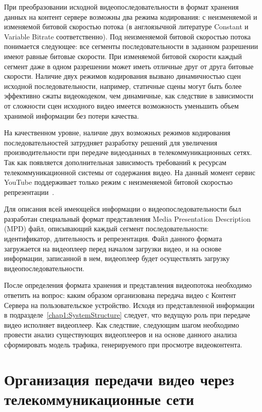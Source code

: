 При преобразовании исходной видеопоследовательности в формат хранения данных на контент сервере возможны два режима кодирования: с неизменяемой и изменяемой битовой скоростью потока (в англоязычной литературе Constant и Variable Bitrate соответственно). Под неизменяемой битовой скоростью потока понимается следующее: все сегменты последовательности в заданном разрешении имеют равные битовые скорости. При изменяемой битовой скорости каждый сегмент даже в одном разрешении может иметь отличные друг от друга битовые скорости. Наличие двух режимов кодирования вызвано динамичностью сцен исходной последовательности, например, статичные сцены могут быть более эффективно сжаты видеокодеком, чем динамичные, как следствие в зависимости от сложности сцен исходного видео имеется возможность уменьшить объем хранимой информации без потери качества.

На качественном уровне, наличие двух возможных режимов кодирования последовательностей затрудняет разработку решений для увеличения производительности при передаче видеоданных в телекоммуникационных сетях. Так как появляется дополнительная зависимость требований к ресурсам телекоммуникационной системы от содержания видео. На данный момент сервис YouTube поддерживает только режим с неизменяемой битовой скоростью репрезентации~\cite{YouTubeBR}.

Для описания всей имеющейся информации о видеопоследовательности был разработан специальный формат представления Media Presentation Description (MPD) файл, описывающий каждый сегмент последовательности: идентификатор, длительность и репрезентация. Файл данного формата загружается на видеоплеер перед началом загрузки видео, и на основе информации, записанной в нем, видеоплеер будет осуществлять загрузку видеопоследовательности.

После определения формата хранения и представления видеопотока необходимо ответить на вопрос: каким образом организована передача видео с Контент Сервера на пользовательское устройство. Исходя из представленной информации в подразделе~\ref{chap1:SystemStructure} следует, что ведущую роль при передаче видео исполняет видеоплеер. Как следствие, следующим шагом необходимо провести анализ существующих видеоплееров и на основе данного анализа сформировать модель трафика, генерируемого при просмотре видеоконтента.

\section{Организация передачи видео через телекоммуникационные сети}
\label{chap1:VideoPlayers}

